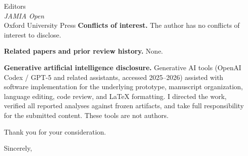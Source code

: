 \documentclass[10pt]{letter}
\begin{document}
\begin{letter}{Editors\\
\textit{JAMIA Open}\\
Oxford University Press}
\textbf{Conflicts of interest.}
The author has no conflicts of interest to disclose.

\textbf{Related papers and prior review history.}
None.

\textbf{Generative artificial intelligence disclosure.}
Generative AI tools (OpenAI Codex / GPT-5 and related assistants, accessed
2025--2026) assisted with software implementation for the underlying
prototype, manuscript organization, language editing, code review, and
\LaTeX{} formatting. I directed the work, verified all reported analyses against
frozen artifacts, and take full responsibility for the submitted content. These
tools are not authors.

Thank you for your consideration.

\closing{Sincerely,}

\end{letter}
\end{document}
